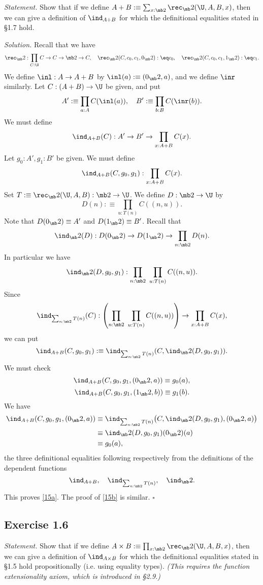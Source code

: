\documentclass[12pt]{article}
\begin{document}
\emph{Statement.} Show that if we define $A+B:\equiv\sum_{x:\mb2}\rec_\mb2(\U,A,B,x)$, then we can give a definition of $\ind_{A+B}$ for which the definitional equalities stated in \S1.7 hold.

\nn\emph{Solution.} Recall that we have 
$$
\rec_\mb2:\prod_{C:\U}C\to C\to\mb2\to C,\quad\rec_\mb2(C,c_0,c_1,0_\mb2):\eq c_0,\quad\rec_\mb2(C,c_0,c_1,1_\mb2):\eq c_1.
$$
We define $\inl:A\to A+B$ by $\inl(a):\equiv(0_\mb2,a)$, and we define $\inr$ similarly. Let $C:(A+B)\to\U$ be given, and put 
$$
A':\equiv\prod_{a:A}C(\inl(a)),\quad B':\equiv\prod_{b:B}C(\inr(b)).
$$
We must define 
$$
\ind_{A+B}(C):A'\to B'\to\prod_{x:A+B}C(x).
$$ 
Let $g_0:A',g_1:B'$ be given. We must define 
$$
\ind_{A+B}(C,g_0,g_1):\prod_{x:A+B}C(x).
$$ 
Set $T:\equiv\rec_\mb2(\U,A,B):\mb2\to\U$. We define $D:\mb2\to\U$ by 
$$
D(n):\equiv\prod_{u:T(n)}C((n,u)).
$$ 
Note that $D(0_\mb2)\equiv A'$ and $D(1_\mb2)\equiv B'$. Recall that 
$$
\ind_\mb2(D):D(0_\mb2)\to D(1_\mb2)\to\prod_{n:\mb2}D(n).
$$ 
In particular we have 
$$
\ind_\mb2(D,g_0,g_1):\prod_{n:\mb2}\ \prod_{u:T(n)}C((n,u)).
$$ 
Since 
$$
\ind_{\sum_{n:\mb2}T(n)}(C):\left(\prod_{n:\mb2}\ \prod_{u:T(n)}C((n,u))\right)\to\prod_{x:A+B}C(x),
$$ 
we can put 
$$
\ind_{A+B}(C,g_0,g_1):\equiv\ind_{\sum_{n:\mb2}T(n)}(C,\ind_\mb2(D,g_0,g_1)).
$$ 
We must check 
\begin{equation}\label{15a}
\ind_{A+B}(C,g_0,g_1,(0_\mb2,a))\equiv g_0(a),
\end{equation}
\begin{equation}\label{15b}
\ind_{A+B}(C,g_0,g_1,(1_\mb2,b))\equiv g_1(b).
\end{equation} 
We have 
\begin{align*}
\ind_{A+B}(C,g_0,g_1,(0_\mb2,a))&\equiv\ind_{\sum_{n:\mb2}T(n)}\big(C,\ind_\mb2(D,g_0,g_1),(0_\mb2,a)\big)\\ 
&\equiv\ind_\mb2(D,g_0,g_1)(0_\mb2)(a)\\ 
&\equiv g_0(a),
\end{align*}
the three definitional equalities following respectively from the definitions of the dependent functions
$$
\ind_{A+B},\quad\ind_{\sum_{n:\mb2}T(n)},\quad\ind_\mb2.
$$ 
This proves \eqref{15a}. The proof of \eqref{15b} is similar. $\square$


\subsection{Exercise 1.6}

\emph{Statement.} Show that if we define $A\times B:\equiv\prod_{x:\mb2}\rec_\mb2(\U,A,B,x)$, then we can give a definition of  $\ind_{A\times B}$ for which the definitional equalities stated in \S1.5 hold propositionally (i.e. using equality types). \emph{(This requires the function extensionality axiom, which is introduced in \S2.9.)}
\end{document}
